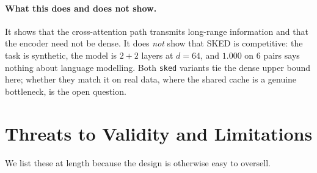 \documentclass[10pt,conference]{IEEEtran}
\newcommand{\code}[1]{\texttt{\small #1}}
\begin{document}
\paragraph{What this does and does not show.} It shows that the cross-attention path
transmits long-range information and that the encoder need not be dense. It does
\emph{not} show that SKED is competitive: the task is synthetic, the model is
$2{+}2$ layers at $d=64$, and $1.000$ on 6 pairs says nothing about language
modelling. Both \code{sked} variants tie the dense upper bound here; whether they
match it on real data, where the shared cache is a genuine bottleneck, is the open
question.

\section{Threats to Validity and Limitations}\label{sec:limits}

We list these at length because the design is otherwise easy to oversell.
\end{document}
